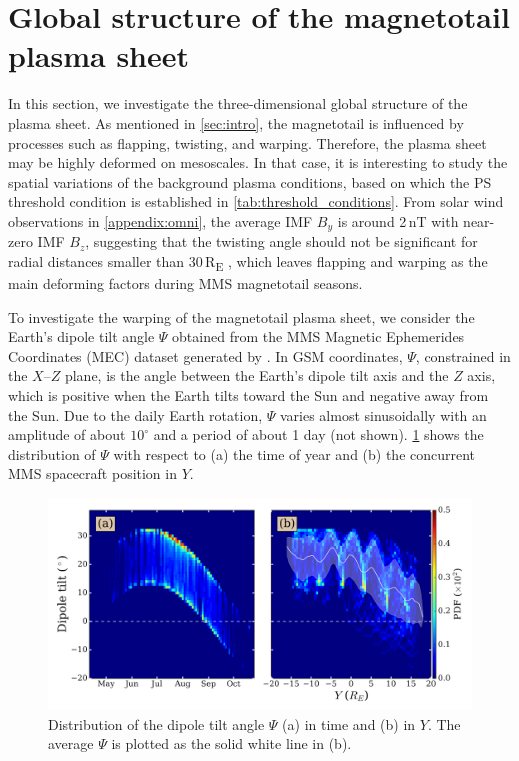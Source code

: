 \documentclass[draft]{agujournal2019}
\begin{document}
\section{Global structure of the magnetotail plasma sheet}
\label{sec:global_structure}

In this section, we investigate the three-dimensional global structure of the plasma sheet. As mentioned in \cref{sec:intro}, the magnetotail is influenced by processes such as flapping, twisting, and warping. Therefore, the plasma sheet may be highly deformed on mesoscales. In that case, it is interesting to study the spatial variations of the background plasma conditions, based on which the PS threshold condition is established in \cref{tab:threshold_conditions}. From solar wind observations in \ref{appendix:omni}, the average IMF $B_y$ is around 2\,\si{nT} with near-zero IMF $B_z$, suggesting that the twisting angle should not be significant for radial distances smaller than 30\,\si{R_E} \cite{Tsyganenko2004}, which leaves flapping and warping as the main deforming factors during MMS magnetotail seasons.

To investigate the warping of the magnetotail plasma sheet, we consider the Earth's dipole tilt angle $\Psi$ obtained from the MMS Magnetic Ephemerides Coordinates (MEC) dataset generated by . In GSM coordinates, $\Psi$, constrained in the $X$--$Z$ plane, is the angle between the Earth's dipole tilt axis and the $Z$ axis, which is positive when the Earth tilts toward the Sun and negative away from the Sun. Due to the daily Earth rotation, $\Psi$ varies almost sinusoidally with an amplitude of about ${10^\circ}$ and a period of about 1 day (not shown). \cref{fig:tilt_distribution} shows the distribution of $\Psi$ with respect to (a) the time of year and (b) the concurrent MMS spacecraft position in $Y$. 

\begin{figure}
\centering
\noindent\includegraphics[width=\textwidth]{Fig5_dipole_tilt.pdf}
\caption{
Distribution of the dipole tilt angle $\Psi$ (a) in time and (b) in $Y$. The average $\Psi$ is plotted as the solid white line in (b).
}
\label{fig:tilt_distribution}
\end{figure}
\end{document}
